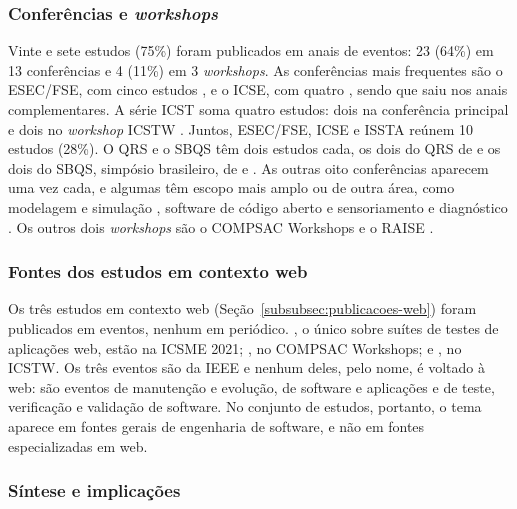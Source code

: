 \subsubsection{Conferências e \textit{workshops}}
\label{subsubsec:conferencias-workshops}

Vinte e sete estudos (75\%) foram publicados em anais de eventos: 23 (64\%) em 13 conferências e 4 (11\%) em 3 \textit{workshops}. As conferências mais frequentes são o ESEC/FSE, com cinco estudos \cite{inozemtseva2013, just2014, kurtz2016, ahmed2016, ojdanic2023}, e o ICSE, com quatro \cite{zhang2010, yao2014, tufano2020, petrovic2021}, sendo que  saiu nos anais complementares. A série ICST soma quatro estudos: dois na conferência principal \cite{nica2011, just2012} e dois no \textit{workshop} ICSTW \cite{esterobotaro2010, ashong2026}. Juntos, ESEC/FSE, ICSE e ISSTA \cite{grano2019} reúnem 10 estudos (28\%). O QRS e o SBQS têm dois estudos cada, os dois do QRS de  e os dois do SBQS, simpósio brasileiro, de  e . As outras oito conferências aparecem uma vez cada, e algumas têm escopo mais amplo ou de outra área, como modelagem e simulação \cite{assylbekov2013}, software de código aberto \cite{alenezi2016} e sensoriamento e diagnóstico \cite{he2024}. Os outros dois \textit{workshops} são o COMPSAC Workshops \cite{belli2011} e o RAISE \cite{jalbert2012}.

\subsubsection{Fontes dos estudos em contexto web}
\label{subsubsec:fontes-web}

Os três estudos em contexto web (Seção~\ref{subsubsec:publicacoes-web}) foram publicados em eventos, nenhum em periódico. , o único sobre suítes de testes de aplicações web, estão na ICSME 2021; , no COMPSAC Workshops; e , no ICSTW. Os três eventos são da IEEE e nenhum deles, pelo nome, é voltado à web: são eventos de manutenção e evolução, de software e aplicações e de teste, verificação e validação de software. No conjunto de estudos, portanto, o tema aparece em fontes gerais de engenharia de software, e não em fontes especializadas em web.

\subsubsection{Síntese e implicações}
\label{subsubsec:sintese-fontes}

